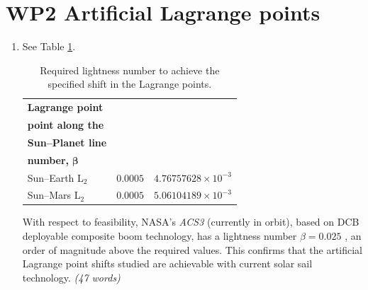 \documentclass[a4paper,12pt]{article}
\begin{document}
\section*{WP2 Artificial Lagrange points}
\label{sec:wp2}
\begin{enumerate}
    \item[\textbf{2.1a}] See Table \ref{tab:lightness_number}. 
    \vspace{1em}
    \begin{table}[htbp]
        \centering
        \caption{Required lightness number to achieve the specified shift in the Lagrange points.}
        \label{tab:lightness_number}
        \begin{tabular}{lcc}
            \toprule
            \textbf{Lagrange point} &
            \makecell{\textbf{Shift in Lagrange} \\ \textbf{point along the} \\ \textbf{Sun--Planet line}} [LU]&
            \makecell{\textbf{Required lightness} \\ \textbf{number,} $\bm{\beta}$} [--]\\
            \midrule
            Sun--Earth L$_2$ & $0.0005$ & $4.76757628 \times 10^{-3}$ \\
            Sun--Mars L$_2$  & $0.0005$ & $5.06104189 \times 10^{-3}$ \\
            \bottomrule
        \end{tabular}
    \end{table} \par

    With respect to feasibility, NASA's \textit{ACS3} (currently in orbit), based on DCB deployable composite boom technology, 
    has a lightness number $\beta = 0.025$ \cite{wilkie2021ACS3}, an order of magnitude above the required values. This confirms that 
    the artificial Lagrange point shifts studied are achievable with current solar sail technology. \textit{(47 words)}


\end{enumerate}
\end{document}
